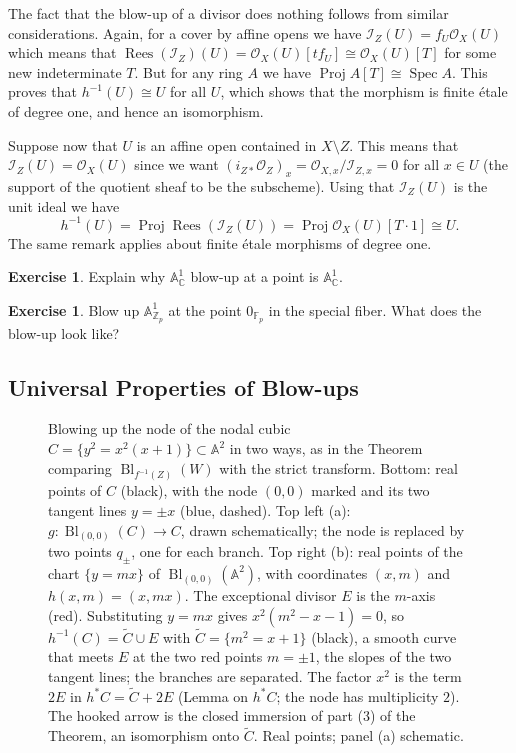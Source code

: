 \documentclass[12pt]{article}
\numberwithin{equation}{section}
\theoremstyle{definition}
\newtheorem{exercise}[theorem]{Exercise}
\theoremstyle{remark}
\newcommand{\FF}{\mathbb{F}}
\newcommand{\CC}{\mathbb{C}}
\newcommand{\ZZ}{\mathbb{Z}}
\newcommand{\Ocal}{\mathcal{O}}
\renewcommand{\AA}{\mathbb{A}}
\newcommand{\Spec}{\operatorname{Spec}}
\newcommand{\Proj}{\operatorname{Proj}}
\newcommand{\Bl}{\operatorname{Bl}}
\newcommand{\Ical}{\mathcal{I}}
\newcommand{\Rees}{\operatorname{Rees}}
\begin{document}
The fact that the blow-up of a divisor does nothing follows from similar considerations. 
Again, for a cover by affine opens we have $\Ical_Z(U) = f_U \Ocal_X(U)$ which means that $\Rees(\Ical_Z)(U) = \Ocal_X(U)[t f_U] \cong \Ocal_X(U)[T]$ for some new indeterminate $T$. 
But for any ring $A$ we have $\Proj A[T] \cong \Spec A$. 
This proves that $h^{-1}(U) \cong U$ for all $U$, which shows that the morphism is finite \'etale of degree one, and hence an isomorphism.

Suppose now that $U$ is an affine open contained in $X\setminus Z$. 
This means that $\Ical_Z(U) = \Ocal_X(U)$ since we want $(i_{Z*}\Ocal_Z)_x = \Ocal_{X,x}/\Ical_{Z,x}=0$ for all $x\in U$ (the support of the quotient sheaf to be the subscheme). 
Using that $\Ical_Z(U)$ is the unit ideal we have 
 $$h^{-1}(U) = \Proj \Rees(\Ical_Z(U)) = \Proj \Ocal_X(U)[T\cdot 1] \cong U. $$
The same remark applies about finite \'etale morphisms of degree one.

\begin{exercise}
	Explain why $\AA^1_{\CC}$ blow-up at a point is $\AA^1_{\CC}$. 
\end{exercise}

\begin{exercise}
	Blow up $\AA^1_{\ZZ_p}$ at the point $0_{\FF_p}$ in the special fiber. 
	What does the blow-up look like?
\end{exercise}

\subsection{Universal Properties of Blow-ups}
\begin{figure}[H]
\centering

\caption{Blowing up the node of the nodal cubic $C=\{y^2=x^2(x+1)\}\subset\AA^2$ in two ways, as in the Theorem comparing $\Bl_{f^{-1}(Z)}(W)$ with the strict transform. Bottom: real points of $C$ (black), with the node $(0,0)$ marked and its two tangent lines $y=\pm x$ (blue, dashed). Top left (a): $g\colon\Bl_{(0,0)}(C)\to C$, drawn schematically; the node is replaced by two points $q_\pm$, one for each branch. Top right (b): real points of the chart $\{y=mx\}$ of $\Bl_{(0,0)}(\AA^2)$, with coordinates $(x,m)$ and $h(x,m)=(x,mx)$. The exceptional divisor $E$ is the $m$-axis (red). Substituting $y=mx$ gives $x^2(m^2-x-1)=0$, so $h^{-1}(C)=\widetilde C\cup E$ with $\widetilde C=\{m^2=x+1\}$ (black), a smooth curve that meets $E$ at the two red points $m=\pm1$, the slopes of the two tangent lines; the branches are separated. The factor $x^2$ is the term $2E$ in $h^*C=\widetilde C+2E$ (Lemma on $h^*C$; the node has multiplicity $2$). The hooked arrow is the closed immersion of part (3) of the Theorem, an isomorphism onto $\widetilde C$. Real points; panel (a) schematic.}\label{fig:nodal-cubic-blowup}
\end{figure}
\end{document}
